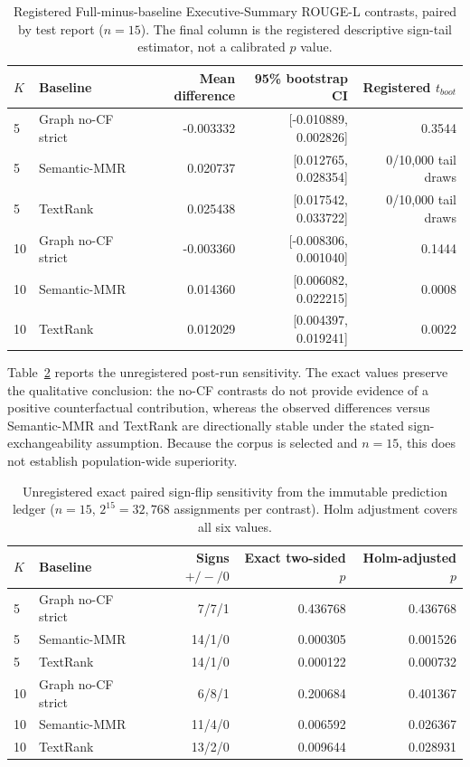 \documentclass[applsci,article,submit,moreauthors]{Definitions/mdpi}
\begin{document}
\begin{table}[H]
\caption{Registered Full-minus-baseline Executive-Summary ROUGE-L contrasts, paired by test report ($n=15$). The final column is the registered descriptive sign-tail estimator, not a calibrated $p$ value.}
\label{tab:contrasts}\centering\small
\begin{tabular}{llrrr}
\toprule
$K$ & Baseline & Mean difference & 95\% bootstrap CI & Registered $t_{boot}$\\
\midrule
5 & Graph no-CF strict & -0.003332 & [-0.010889, 0.002826] & 0.3544\\
5 & Semantic-MMR & 0.020737 & [0.012765, 0.028354] & 0/10,000 tail draws\\
5 & TextRank & 0.025438 & [0.017542, 0.033722] & 0/10,000 tail draws\\
10 & Graph no-CF strict & -0.003360 & [-0.008306, 0.001040] & 0.1444\\
10 & Semantic-MMR & 0.014360 & [0.006082, 0.022215] & 0.0008\\
10 & TextRank & 0.012029 & [0.004397, 0.019241] & 0.0022\\
\bottomrule
\end{tabular}
\end{table}

Table~\ref{tab:signflip} reports the unregistered post-run sensitivity. The exact values preserve the qualitative conclusion: the no-CF contrasts do not provide evidence of a positive counterfactual contribution, whereas the observed differences versus Semantic-MMR and TextRank are directionally stable under the stated sign-exchangeability assumption. Because the corpus is selected and $n=15$, this does not establish population-wide superiority.

\begin{table}[H]
\caption{Unregistered exact paired sign-flip sensitivity from the immutable prediction ledger ($n=15$, $2^{15}=32{,}768$ assignments per contrast). Holm adjustment covers all six values.}
\label{tab:signflip}\centering\small
\begin{tabular}{llrrr}
\toprule
$K$ & Baseline & Signs $+/-/0$ & Exact two-sided $p$ & Holm-adjusted $p$\\
\midrule
5 & Graph no-CF strict & 7/7/1 & 0.436768 & 0.436768\\
5 & Semantic-MMR & 14/1/0 & 0.000305 & 0.001526\\
5 & TextRank & 14/1/0 & 0.000122 & 0.000732\\
10 & Graph no-CF strict & 6/8/1 & 0.200684 & 0.401367\\
10 & Semantic-MMR & 11/4/0 & 0.006592 & 0.026367\\
10 & TextRank & 13/2/0 & 0.009644 & 0.028931\\
\bottomrule
\end{tabular}
\end{table}
\end{document}
